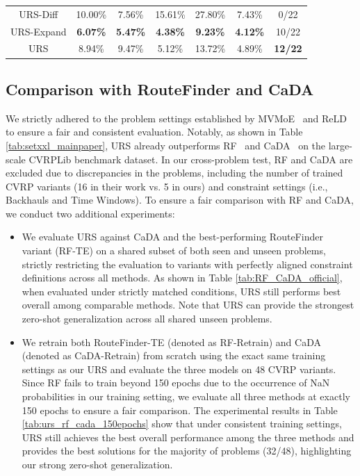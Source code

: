 \documentclass{article}
\theoremstyle{plain}
\theoremstyle{definition}
\theoremstyle{remark}
\begin{document}
\begin{table}[htbp]
{\begin{tabular}{c|c|c|c|c|c|c}
    \midrule
    URS-Diff & 10.00\% & 7.56\% & 15.61\% & 27.80\% & 7.43\% & 0/22 \\
    URS-Expand & \cellcolor[HTML]{D0CECE}\textbf{6.07\%} & \cellcolor[HTML]{D0CECE}\textbf{5.47\%} & \cellcolor[HTML]{D0CECE}\textbf{4.38\%} & \cellcolor[HTML]{D0CECE}\textbf{9.23\%} & \cellcolor[HTML]{D0CECE}\textbf{4.12\%} & 10/22 \\
    URS   & 8.94\% & 9.47\% & 5.12\% & 13.72\% & 4.89\% & \cellcolor[HTML]{D0CECE}\textbf{12/22} \\
    \bottomrule[0.5mm]
    \end{tabular}%
    }
  \label{tab:ablation_diff_training_problems}%
\end{table}%


\clearpage

\subsection{Comparison with RouteFinder and CaDA}
\label{append:compare_rf_cada}
We strictly adhered to the problem settings established by MVMoE~\citep{zhou2024mvmoe} and ReLD~\citep{huang2025reld} to ensure a fair and consistent evaluation. Notably, as shown in Table \ref{tab:setxxl_mainpaper}, URS already outperforms RF~\citep{berto2024routefinder} and CaDA~\citep{li2025cada} on the large-scale CVRPLib benchmark dataset. In our cross-problem test, RF and CaDA are excluded due to discrepancies in the problems, including the number of trained CVRP variants (16 in their work vs. 5 in ours) and constraint settings (i.e., Backhauls and Time Windows). To ensure a fair comparison with RF and CaDA, we conduct two additional experiments: 
\begin{itemize}
    \item We evaluate URS against CaDA and the best-performing RouteFinder variant (RF-TE) on a shared subset of both seen and unseen problems, strictly restricting the evaluation to variants with perfectly aligned constraint definitions across all methods. As shown in Table \ref{tab:RF_CaDA_official}, when evaluated under strictly matched conditions, URS still performs best overall among comparable methods. Note that URS can provide the strongest zero-shot generalization across all shared unseen problems.
    \item We retrain both RouteFinder-TE (denoted as RF-Retrain) and CaDA (denoted as CaDA-Retrain) from scratch using the exact same training settings as our URS and evaluate the three models on 48 CVRP variants. Since RF fails to train beyond 150 epochs due to the occurrence of NaN probabilities in our training setting, we evaluate all three methods at exactly 150 epochs to ensure a fair comparison. The experimental results in Table \ref{tab:urs_rf_cada_150epochs} show that under consistent training settings, URS still achieves the best overall performance among the three methods and provides the best solutions for the majority of problems (32/48), highlighting our strong zero-shot generalization.
\end{itemize}
\end{document}
